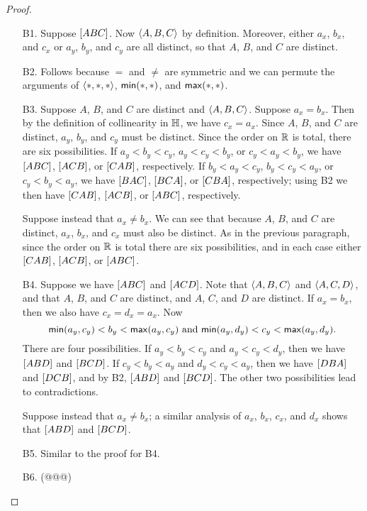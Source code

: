 \begin{proof}\mbox{}
\begin{itemize}
\item[B1.] Suppose \([ A B C ]\).
Now \(\langle A, B, C \rangle\) by definition.
Moreover, either \(a_x\), \(b_x\), and \(c_x\) or \(a_y\), \(b_y\), and \(c_y\) are all distinct, so that \(A\), \(B\), and \(C\) are distinct.

\item[B2.] Follows because \(=\) and \(\neq\) are symmetric and we can permute the arguments of \(\langle \ast, \ast, \ast \rangle\), \(\mathsf{min}(\ast,\ast)\), and \(\mathsf{max}(\ast,\ast)\).

\item[B3.] Suppose \(A\), \(B\), and \(C\) are distinct and \(\langle A, B, C \rangle\).
Suppose \(a_x = b_x\).
Then by the definition of collinearity in \(\mathbb{H}\), we have \(c_x = a_x\).
Since \(A\), \(B\), and \(C\) are distinct, \(a_y\), \(b_y\), and \(c_y\) must be distinct.
Since the order on \(\mathbb{R}\) is total, there are six possibilities.
If \(a_y < b_y < c_y\), \(a_y < c_y < b_y\), or \(c_y < a_y < b_y\), we have \([ A B C ]\), \([ A C B ]\), or \([ C A B ]\), respectively.
If \(b_y < a_y < c_y\), \(b_y < c_y < a_y\), or \(c_y < b_y < a_y\), we have \([ B A C ]\), \([ B C A ]\), or \([ C B A ]\), respectively; using B2 we then have \([ C A B ]\), \([ A C B ]\), or \([ A B C ]\), respectively.

Suppose instead that \(a_x \neq b_x\).
We can see that because \(A\), \(B\), and \(C\) are distinct, \(a_x\), \(b_x\), and \(c_x\) must also be distinct.
As in the previous paragraph, since the order on \(\mathbb{R}\) is total there are six possibilities, and in each case either \([ C A B ]\), \([ A C B ]\), or \([ A B C ]\).

\item[B4.] Suppose we have \([ A B C ]\) and \([ A C D ]\).
Note that \(\langle A, B, C \rangle\) and \(\langle A, C, D \rangle\), and that \(A\), \(B\), and \(C\) are distinct, and \(A\), \(C\), and \(D\) are distinct.
If \(a_x = b_x\), then we also have \(c_x = d_x = a_x\).
Now \[ \mathsf{min}(a_y,c_y) < b_y < \mathsf{max}(a_y,c_y)\ \mathrm{and}\ \mathsf{min}(a_y,d_y) < c_y < \mathsf{max}(a_y,d_y). \]
There are four possibilities.
If \(a_y < b_y < c_y\) and \(a_y < c_y < d_y\), then we have \([ A B D ]\) and \([ B C D ]\).
If \(c_y < b_y < a_y\) and \(d_y < c_y < a_y\), then we have \([ D B A ]\) and \([ D C B ]\), and by B2, \([ A B D ]\) and \([ B C D ]\).
The other two possibilities lead to contradictions.

Suppose instead that \(a_x \neq b_x\); a similar analysis of \(a_x\), \(b_x\), \(c_x\), and \(d_x\) shows that \([ A B D ]\) and \([ B C D ]\).

\item[B5.] Similar to the proof for B4.

\item[B6.] (@@@)
\end{itemize}
\end{proof}


